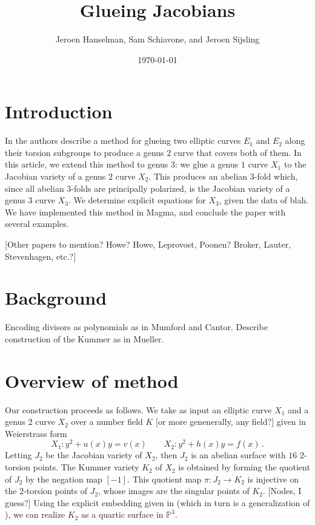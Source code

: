 \documentclass[reqno, 12pt]{amsart}
\theoremstyle{definition}
\theoremstyle{remark}
\renewcommand{\P}{\mathbb P}
\newcommand{\sss}[1]{{\color{blue} [#1]}}
\begin{document}
\title{Glueing Jacobians}
\author{Jeroen Hanselman, Sam Schiavone, and Jeroen Sijsling}
\date{\today}

\maketitle

\tableofcontents

\section{Introduction}
In \cite{FreyKani}
the authors describe a method for glueing two elliptic curves $E_1$ and $E_2$ along their torsion subgroups to produce a genus $2$ curve that covers both of them. In this article, we extend this method to genus $3$: we glue a genus $1$ curve $X_1$ to the Jacobian variety of a genus $2$ curve $X_2$. This produces an abelian $3$-fold which, since all abelian $3$-folds are principally polarized, is the Jacobian variety of a genus $3$ curve $X_3$. We determine explicit equations for $X_3$, given the data of blah. We have implemented this method in \textsf{Magma}, and conclude the paper with several examples.

\sss{Other papers to mention? Howe? Howe, Leprovost, Poonen? Broker, Lauter, Stevenhagen, etc.?}

\section{Background}

Encoding divisors as polynomials as in Mumford and Cantor. Describe construction of the Kummer as in Mueller.

\section{Overview of method}

Our construction proceeds as follows. We take as input an elliptic curve $X_1$ and a genus $2$ curve $X_2$ over a number field $K$ \sss{or more genenerally, any field?} given in Weierstrass form
$$
X_1: y^2 + u(x) y = v(x) \qquad
X_2: y^2 + h(x) y = f(x) \, .
$$
Letting $J_2$ be the Jacobian variety of $X_2$, then $J_2$ is an abelian surface with $16$ $2$-torsion points. The Kummer variety $K_2$ of $X_2$ is obtained by forming the quotient of $J_2$ by the negation map $[-1]$. This quotient map $\pi : J_2 \to K_2$ is injective on the $2$-torsion points of $J_2$, whose images are the singular points of $K_2$. \sss{Nodes, I guess?} Using  the explicit embedding given in \cite{Mueller} (which in turn is a generalization of \cite{CasselsFlynn}), we can realize $K_2$ as a quartic surface in $\P^3$.
\end{document}
